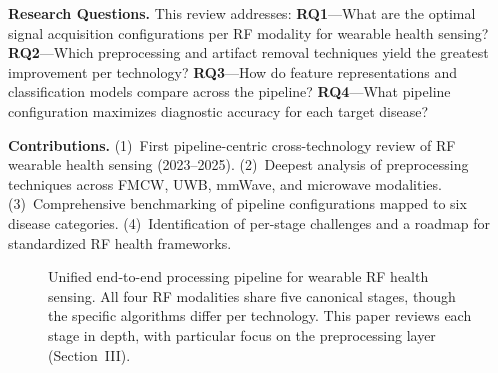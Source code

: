 \documentclass[journal,twoside]{IEEEtran}
\begin{document}
\textbf{Research Questions.} This review addresses: \textbf{RQ1}---What are the optimal signal acquisition configurations per RF modality for wearable health sensing? \textbf{RQ2}---Which preprocessing and artifact removal techniques yield the greatest improvement per technology? \textbf{RQ3}---How do feature representations and classification models compare across the pipeline? \textbf{RQ4}---What pipeline configuration maximizes diagnostic accuracy for each target disease?

\textbf{Contributions.} (1)~First pipeline-centric cross-technology review of RF wearable health sensing (2023--2025). (2)~Deepest analysis of preprocessing techniques across FMCW, UWB, mmWave, and microwave modalities. (3)~Comprehensive benchmarking of pipeline configurations mapped to six disease categories. (4)~Identification of per-stage challenges and a roadmap for standardized RF health frameworks.

\begin{figure}[!t]
\centering
{}
\caption{Unified end-to-end processing pipeline for wearable RF health sensing. All four RF modalities share five canonical stages, though the specific algorithms differ per technology. This paper reviews each stage in depth, with particular focus on the preprocessing layer (Section~III).}
\label{fig:pipeline_overview}
\end{figure}
\end{document}
